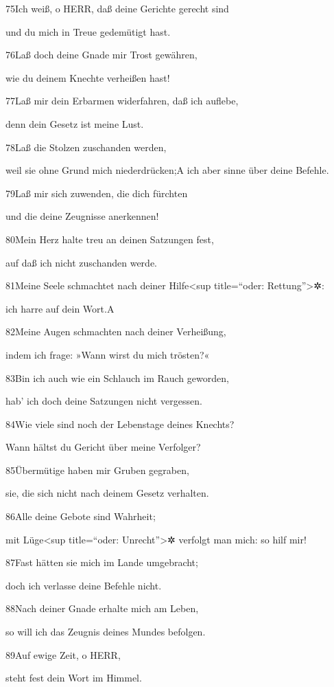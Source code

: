 75Ich weiß, o HERR, daß deine Gerichte gerecht sind

und du mich in Treue gedemütigt hast.

76Laß doch deine Gnade mir Trost gewähren,

wie du deinem Knechte verheißen hast!

77Laß mir dein Erbarmen widerfahren, daß ich auflebe,

denn dein Gesetz ist meine Lust.

78Laß die Stolzen zuschanden werden,

weil sie ohne Grund mich niederdrücken;{A} ich aber sinne über deine
Befehle.

79Laß mir sich zuwenden, die dich fürchten

und die deine Zeugnisse anerkennen!

80Mein Herz halte treu an deinen Satzungen fest,

auf daß ich nicht zuschanden werde.

81Meine Seele schmachtet nach deiner Hilfe\textless sup title=``oder:
Rettung''\textgreater✲:

ich harre auf dein Wort.{A}

82Meine Augen schmachten nach deiner Verheißung,

indem ich frage: »Wann wirst du mich trösten?«

83Bin ich auch wie ein Schlauch im Rauch geworden,

hab' ich doch deine Satzungen nicht vergessen.

84Wie viele sind noch der Lebenstage deines Knechts?

Wann hältst du Gericht über meine Verfolger?

85Übermütige haben mir Gruben gegraben,

sie, die sich nicht nach deinem Gesetz verhalten.

86Alle deine Gebote sind Wahrheit;

mit Lüge\textless sup title=``oder: Unrecht''\textgreater✲ verfolgt man
mich: so hilf mir!

87Fast hätten sie mich im Lande umgebracht;

doch ich verlasse deine Befehle nicht.

88Nach deiner Gnade erhalte mich am Leben,

so will ich das Zeugnis deines Mundes befolgen.

89Auf ewige Zeit, o HERR,

steht fest dein Wort im Himmel.

